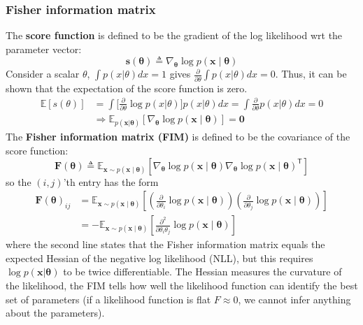 \documentclass[11pt]{article}
\begin{document}
\subsubsection*{Fisher information matrix}
The \textbf{score function} is defined to be the gradient of the log likelihood wrt the parameter vector:
\[
\boldsymbol{s}(\boldsymbol{\theta}) \triangleq \nabla_{\boldsymbol{\theta}} \log p(\boldsymbol{x} \mid \boldsymbol{\theta})
\]
Consider a scalar $\theta$, $\int p(x | \theta) dx = 1$ gives $\frac{\partial}{\partial \theta} \int p(x | \theta) dx = 0$. Thus, it can be shown that the expectation of the score function is zero.
\[
\begin{aligned}
\mathbb{E}\left[ s(\theta) \right] &= \int \Big[\frac{\partial}{\partial \theta} \log p(x|\theta)  \Big] p(x|\theta) dx = \int \frac{\partial}{\partial \theta} p(x|\theta) dx = 0 \\
&\Rightarrow \mathbb{E}_{p(\boldsymbol{x} | \boldsymbol{\theta})}\left[ \nabla_{\boldsymbol{\theta}} \log p(\boldsymbol{x} \mid \boldsymbol{\theta}) \right] = \boldsymbol{0}
\end{aligned}
\]
The \textbf{Fisher information matrix (FIM)} is defined to be the covariance of the score function:
\[
\mathbf{F}(\boldsymbol{\theta}) \triangleq \mathbb{E}_{\boldsymbol{x} \sim p(\boldsymbol{x} \mid \boldsymbol{\theta})} \left[ \nabla_{\boldsymbol{\theta}} \log p(\boldsymbol{x} \mid \boldsymbol{\theta}) \nabla_{\boldsymbol{\theta}} \log p(\boldsymbol{x} \mid \boldsymbol{\theta})^{\mathsf{T}} \right]
\]
so the $(i,j)$'th entry has the form
\[
\begin{aligned}
\mathbf{F}(\boldsymbol{\theta})_{ij} &= \mathbb{E}_{\boldsymbol{x} \sim p(\boldsymbol{x} \mid \boldsymbol{\theta})} \left[ \left( \frac{\partial}{\partial \theta_i} \log p(\boldsymbol{x} \mid \boldsymbol{\theta}) \right) \left( \frac{\partial}{\partial \theta_j} \log p(\boldsymbol{x} \mid \boldsymbol{\theta}) \right) \right] \\
&= -\mathbb{E}_{\boldsymbol{x} \sim p(\boldsymbol{x} \mid \boldsymbol{\theta})} \left[ \frac{\partial^2}{\partial \theta_i \theta_j} \log p(\boldsymbol{x} \mid \boldsymbol{\theta})\right] 
\end{aligned}
\]
where the second line states that the Fisher information matrix equals the expected Hessian of the negative log likelihood (NLL), but this requires $\log p(\boldsymbol{x} | \boldsymbol{\theta})$ to be twice differentiable.
The Hessian measures the curvature of the likelihood, the FIM tells how well the likelihood function can identify the best set of parameters (if a likelihood function is flat $F \approx 0$, we cannot infer anything about the parameters).
\end{document}
